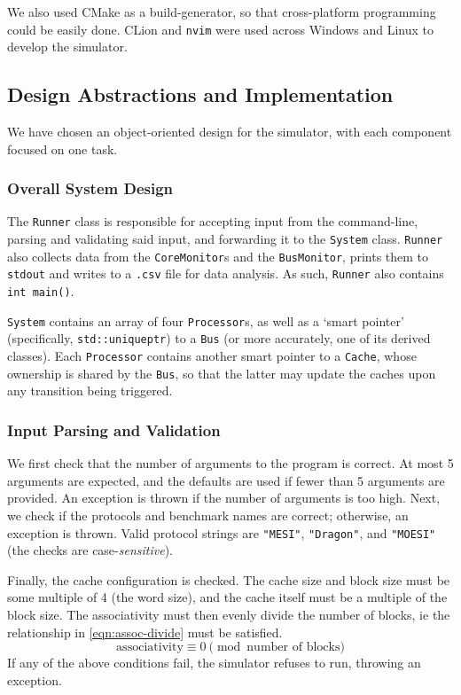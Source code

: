\documentclass[date,tikzlibs,lmodern,10pt]{epreport}
\begin{document}
We also used CMake as a build-generator, so that cross-platform programming could be easily done.
CLion and \texttt{nvim} were used across Windows and Linux to develop the simulator.

\subsection{Design Abstractions and Implementation}
We have chosen an object-oriented design for the simulator, with each component focused on one task.

\subsubsection{Overall System Design}
The \texttt{Runner} class is responsible for accepting input from the command-line, parsing and validating said input, and forwarding it to the \texttt{System} class.
\texttt{Runner} also collects data from the \texttt{CoreMonitor}s and the \texttt{BusMonitor}, prints them to \texttt{stdout} and writes to a \texttt{.csv} file for data analysis.
As such, \texttt{Runner} also contains \texttt{int main()}.

\texttt{System} contains an array of four \texttt{Processor}s, as well as a `smart pointer' (specifically, \texttt{std::unique\textunderscore{}ptr}) to a \texttt{Bus} (or more accurately, one of its derived classes).
Each \texttt{Processor} contains another smart pointer to a \texttt{Cache}, whose ownership is shared by the \texttt{Bus}, so that the latter may update the caches upon any transition being triggered.

\subsubsection{Input Parsing and Validation}
We first check that the number of arguments to the program is correct. At most 5 arguments are expected, and the defaults are used if fewer than 5 arguments are provided.
An exception is thrown if the number of arguments is too high.
Next, we check if the protocols and benchmark names are correct; otherwise, an exception is thrown.
Valid protocol strings are \texttt{"MESI"}, \texttt{"Dragon"}, and \texttt{"MOESI"} (the checks are case-\emph{sensitive}).

Finally, the cache configuration is checked.
The cache size and block size must be some multiple of 4 (the word size), and the cache itself must be a multiple of the block size.
The associativity must then evenly divide the number of blocks, ie the relationship in \cref{eqn:assoc-divide} must be satisfied.
\begin{equation}
	\mathrm{associativity} \equiv 0 \pmod{\text{number of blocks}}\label{eqn:assoc-divide}
\end{equation}
If any of the above conditions fail, the simulator refuses to run, throwing an exception.
\end{document}
